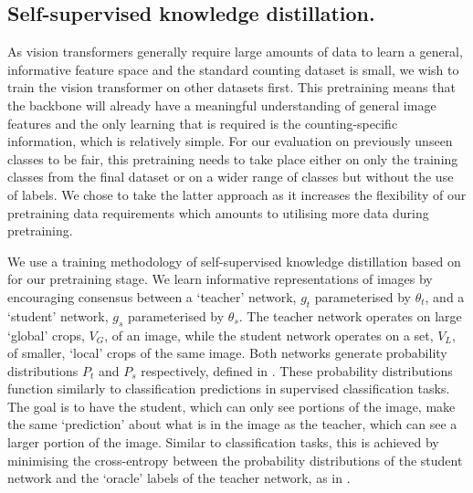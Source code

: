 \documentclass[../thesis.tex]{subfiles}
\begin{document}
\subsection{Self-supervised knowledge distillation.}\label{LTCA__sec__self-supervised}

As vision transformers generally require large amounts of data to learn a general, informative feature space and the standard counting dataset is small, we wish to train the vision transformer on other datasets first.
This pretraining means that the backbone will already have a meaningful understanding of general image features and the only learning that is required is the counting-specific information, which is relatively simple.
For our evaluation on previously unseen classes to be fair, this pretraining needs to take place either on only the training classes from the final dataset or on a wider range of classes but without the use of labels.
We chose to take the latter approach as it increases the flexibility of our pretraining data requirements which amounts to utilising more data during pretraining.

We use a training methodology of self-supervised knowledge distillation based on \citet{caron2021DINO} for our pretraining stage.
We learn informative representations of images by encouraging consensus between a `teacher' network, $g_{t}$ parameterised by $\theta_{t}$,  and a `student' network, $g_{s}$ parameterised by $\theta_{s}$.
The teacher network operates on large `global' crops, $V_G$,  of an image, while the student network operates on a set, $V_L$, of smaller, `local' crops of the same image.
Both networks generate probability distributions $P_{t}$ and $P_{s}$ respectively, defined in .
These probability distributions function similarly to classification predictions in supervised classification tasks.
The goal is to have the student, which can only see portions of the image, make the same `prediction' about what is in the image as the teacher, which can see a larger portion of the image.
Similar to classification tasks, this is achieved by minimising the cross-entropy between the probability distributions of the student network and the `oracle' labels of the teacher network, as in .
\end{document}
